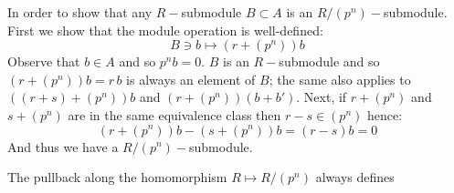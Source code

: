 In order to show that any $R-$submodule $B\subset A$ is an $R/(p^n)-$submodule. First we show that the module operation is well-defined:
$$B\ni b \mapsto (r+(p^n))b$$
Observe that  $b\in A$ and so $p^nb=0$. $B$  is an $R-$submodule and so $(r+(p^n) )b = r\, b$ is  always an element of $B$; the same  also applies to   $((r+s)+(p^n))b$ and $(r+(p^n) )(b+b')$.
Next, if $r+(p^n)$ and $s+(p^n) $ are in the same equivalence class then $r-s\in (p^n)$ hence:
$$(r+(p^n))b -  (s+(p^n))b= (r-s)b=0$$
And thus we have a $R/(p^n)-$submodule.

The pullback along the homomorphism $R\mapsto R/(p^n)$ always defines 
